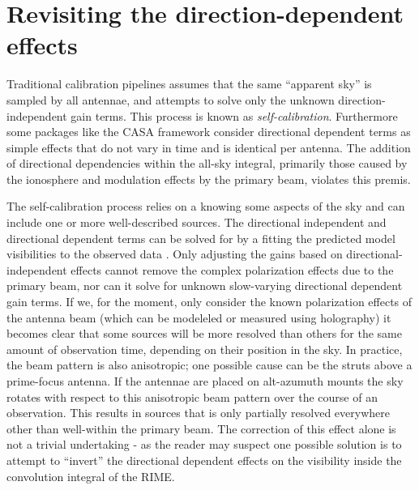 \section{Revisiting the direction-dependent effects}
Traditional calibration pipelines assumes that the same ``apparent sky'' is sampled by all antennae, and attempts to solve only the unknown direction-independent gain terms.
This process is known as \textit{self-calibration}. Furthermore some packages like the CASA framework consider directional dependent terms as simple effects 
that do not vary in time and is identical per antenna. The addition of directional dependencies within the all-sky integral, primarily those caused by the 
ionosphere and modulation effects by the primary beam, violates this premis. 

The self-calibration process relies on a knowing some aspects of the sky and can include one or more well-described sources. The directional
independent and directional dependent terms can be solved for by a fitting the predicted model visibilities to the observed 
data \cite{noordam2010meqtrees}. Only adjusting the gains based on directional-independent effects cannot remove the complex 
polarization effects due to the primary beam, nor can it solve for unknown slow-varying directional dependent gain terms. If we, for 
the moment, only consider the known polarization effects of the antenna beam (which can be modeleled or measured using holography) it 
becomes clear that some sources will be more resolved than others for the same amount of observation time, 
depending on their position in the sky. In practice, the beam pattern is also anisotropic; one possible cause can be 
the struts above a prime-focus antenna. If the antennae are placed on alt-azumuth mounts the sky rotates with respect 
to this anisotropic beam pattern over the course of an observation. This results in sources that is only partially 
resolved everywhere other than well-within the primary beam. The correction of this effect alone is not a trivial undertaking - 
as the reader may suspect one possible solution is to attempt to ``invert'' the directional dependent effects on the visibility 
inside the convolution integral of the RIME.

